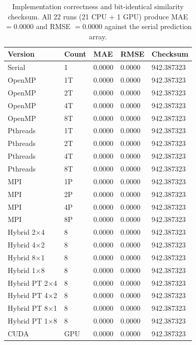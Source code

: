 \documentclass[11pt,a4paper]{article}
\begin{document}
\begin{table}[!htbp]
\centering
\small
\begin{tabular}{L{3.1cm} C{1.6cm} C{2.0cm} C{2.0cm} R{2.8cm}}
\toprule
\textbf{Version} & \textbf{Count} & \textbf{MAE} & \textbf{RMSE} &
\textbf{Checksum} \\
\midrule
Serial         & 1   & 0.0000 & 0.0000 & 942.387323 \\
OpenMP         & 1T  & 0.0000 & 0.0000 & 942.387323 \\
OpenMP         & 2T  & 0.0000 & 0.0000 & 942.387323 \\
OpenMP         & 4T  & 0.0000 & 0.0000 & 942.387323 \\
OpenMP         & 8T  & 0.0000 & 0.0000 & 942.387323 \\
Pthreads       & 1T  & 0.0000 & 0.0000 & 942.387323 \\
Pthreads       & 2T  & 0.0000 & 0.0000 & 942.387323 \\
Pthreads       & 4T  & 0.0000 & 0.0000 & 942.387323 \\
Pthreads       & 8T  & 0.0000 & 0.0000 & 942.387323 \\
MPI            & 1P  & 0.0000 & 0.0000 & 942.387323 \\
MPI            & 2P  & 0.0000 & 0.0000 & 942.387323 \\
MPI            & 4P  & 0.0000 & 0.0000 & 942.387323 \\
MPI            & 8P  & 0.0000 & 0.0000 & 942.387323 \\
Hybrid 2$\times$4   & 8 & 0.0000 & 0.0000 & 942.387323 \\
Hybrid 4$\times$2   & 8 & 0.0000 & 0.0000 & 942.387323 \\
Hybrid 8$\times$1   & 8 & 0.0000 & 0.0000 & 942.387323 \\
Hybrid 1$\times$8   & 8 & 0.0000 & 0.0000 & 942.387323 \\
Hybrid PT 2$\times$4 & 8 & 0.0000 & 0.0000 & 942.387323 \\
Hybrid PT 4$\times$2 & 8 & 0.0000 & 0.0000 & 942.387323 \\
Hybrid PT 8$\times$1 & 8 & 0.0000 & 0.0000 & 942.387323 \\
Hybrid PT 1$\times$8 & 8 & 0.0000 & 0.0000 & 942.387323 \\
CUDA           & GPU & 0.0000 & 0.0000 & 942.387323 \\
\bottomrule
\end{tabular}
\caption{Implementation correctness and bit-identical similarity checksum. All
22 runs (21 CPU + 1 GPU) produce MAE $=0.0000$ and RMSE $=0.0000$ against the
serial prediction array.}
\label{tab:acc}
\end{table}
\end{document}
